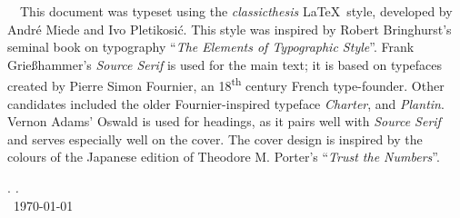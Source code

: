 \thispagestyle{empty}

\hfill

\vfill


\noindent \adftripleflourishright~~This document was typeset using the \emph{classicthesis} \LaTeX~style, developed by Andr\'e Miede and Ivo Pletikosić.
This style was inspired by Robert Bringhurst's seminal book on typography ``\emph{The Elements of Typographic Style}''.
Frank Grie{\ss}hammer's \textit{Source Serif} is used for the main text; it is based on typefaces created by Pierre Simon Fournier, an 18\textsuperscript{th} century French type-founder.
Other candidates included the older Fournier-inspired typeface \textit{Charter}, and \textit{Plantin}.
Vernon Adams' \textsf{Oswald} is used for headings, as it pairs well with \textit{Source Serif} and serves especially well on the cover.
The cover design is inspired by the colours of the Japanese edition of Theodore M. Porter's ``\emph{Trust the Numbers}''.

\bigskip

\noindent\finalVersionString

\noindent\myName. \textit{\myTitle.}%
\\
\noindent \textcopyright\ \today

%
%
%
%
%
